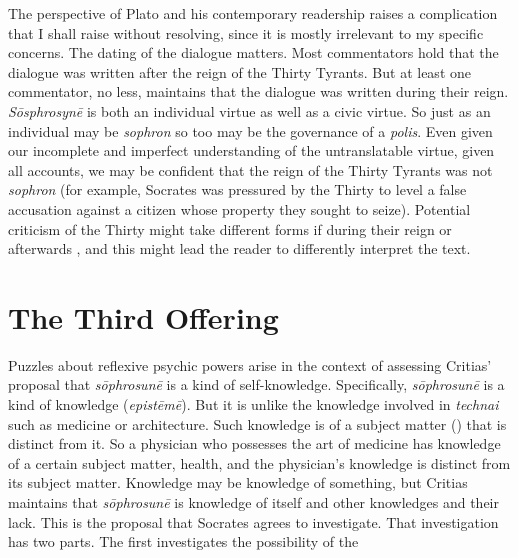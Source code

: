 The perspective of Plato and his contemporary readership raises a complication that I shall raise without resolving, since it is mostly irrelevant to my specific concerns. The dating of the dialogue matters. Most commentators hold that the dialogue was written after the reign of the Thirty Tyrants. But at least one commentator, \citet[108–9]{Schleiermarcher:1836aa} no less, maintains that the dialogue was written during their reign. \emph{Sōsphrosynē} is both an individual virtue as well as a civic virtue. So just as an individual may be \emph{sophron} so too may be the governance of a \emph{polis}. Even given our incomplete and imperfect understanding of the untranslatable virtue, given all accounts, we may be confident that the reign of the Thirty Tyrants was not \emph{sophron} (for example, Socrates was pressured by the Thirty to level a false accusation against a citizen whose property they sought to seize). Potential criticism of the Thirty might take different forms if during their reign or afterwards \citep[42]{Hyland:1981aa}, and this might lead the reader to differently interpret the text.


\section{The Third Offering} %
\label{sec:the_third_offering}

Puzzles about reflexive psychic powers arise in the context of assessing Critias' proposal that \emph{sōphrosunē} is a kind of self-knowledge. Specifically, \emph{sōphrosunē} is a kind of knowledge (\emph{epistēmē}). But it is unlike the knowledge involved in \emph{technai} such as medicine or architecture. Such knowledge is of a subject matter () that is distinct from it. So a physician who possesses the art of medicine has knowledge of a certain subject matter, health, and the physician's knowledge is distinct from its subject matter. Knowledge may be knowledge of something, but Critias maintains that \emph{sōphrosunē} is knowledge of itself and other knowledges and their lack. This is the proposal that Socrates agrees to investigate. That investigation has two parts. The first investigates the possibility of the 



